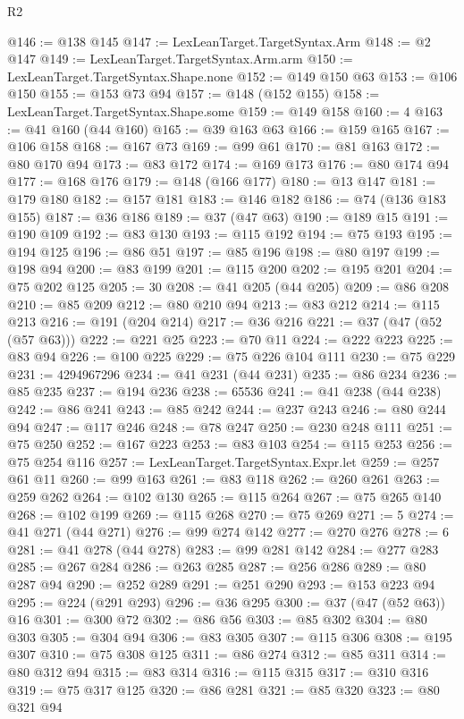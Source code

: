 \begin{lexlean}{R2}
\begin{coremodule}
@146 := @138 @145
@147 := LexLeanTarget.TargetSyntax.Arm
@148 := @2 @147
@149 := LexLeanTarget.TargetSyntax.Arm.arm
@150 := LexLeanTarget.TargetSyntax.Shape.none
@152 := @149 @150 @63
@153 := @106 @150
@155 := @153 @73 @94
@157 := @148 (@152 @155)
@158 := LexLeanTarget.TargetSyntax.Shape.some
@159 := @149 @158
@160 := 4
@163 := @41 @160 (@44 @160)
@165 := @39 @163 @63
@166 := @159 @165
@167 := @106 @158
@168 := @167 @73
@169 := @99 @61
@170 := @81 @163
@172 := @80 @170 @94
@173 := @83 @172
@174 := @169 @173
@176 := @80 @174 @94
@177 := @168 @176
@179 := @148 (@166 @177)
@180 := @13 @147
@181 := @179 @180
@182 := @157 @181
@183 := @146 @182
@186 := @74 (@136 @183 @155)
@187 := @36 @186
@189 := @37 (@47 @63)
@190 := @189 @15
@191 := @190 @109
@192 := @83 @130
@193 := @115 @192
@194 := @75 @193
@195 := @194 @125
@196 := @86 @51
@197 := @85 @196
@198 := @80 @197
@199 := @198 @94
@200 := @83 @199
@201 := @115 @200
@202 := @195 @201
@204 := @75 @202 @125
@205 := 30
@208 := @41 @205 (@44 @205)
@209 := @86 @208
@210 := @85 @209
@212 := @80 @210 @94
@213 := @83 @212
@214 := @115 @213
@216 := @191 (@204 @214)
@217 := @36 @216
@221 := @37 (@47 (@52 (@57 @63)))
@222 := @221 @25
@223 := @70 @11
@224 := @222 @223
@225 := @83 @94
@226 := @100 @225
@229 := @75 @226 @104 @111
@230 := @75 @229
@231 := 4294967296
@234 := @41 @231 (@44 @231)
@235 := @86 @234
@236 := @85 @235
@237 := @194 @236
@238 := 65536
@241 := @41 @238 (@44 @238)
@242 := @86 @241
@243 := @85 @242
@244 := @237 @243
@246 := @80 @244 @94
@247 := @117 @246
@248 := @78 @247
@250 := @230 @248 @111
@251 := @75 @250
@252 := @167 @223
@253 := @83 @103
@254 := @115 @253
@256 := @75 @254 @116
@257 := LexLeanTarget.TargetSyntax.Expr.let
@259 := @257 @61 @11
@260 := @99 @163
@261 := @83 @118
@262 := @260 @261
@263 := @259 @262
@264 := @102 @130
@265 := @115 @264
@267 := @75 @265 @140
@268 := @102 @199
@269 := @115 @268
@270 := @75 @269
@271 := 5
@274 := @41 @271 (@44 @271)
@276 := @99 @274 @142
@277 := @270 @276
@278 := 6
@281 := @41 @278 (@44 @278)
@283 := @99 @281 @142
@284 := @277 @283
@285 := @267 @284
@286 := @263 @285
@287 := @256 @286
@289 := @80 @287 @94
@290 := @252 @289
@291 := @251 @290
@293 := @153 @223 @94
@295 := @224 (@291 @293)
@296 := @36 @295
@300 := @37 (@47 (@52 @63)) @16
@301 := @300 @72
@302 := @86 @56
@303 := @85 @302
@304 := @80 @303
@305 := @304 @94
@306 := @83 @305
@307 := @115 @306
@308 := @195 @307
@310 := @75 @308 @125
@311 := @86 @274
@312 := @85 @311
@314 := @80 @312 @94
@315 := @83 @314
@316 := @115 @315
@317 := @310 @316
@319 := @75 @317 @125
@320 := @86 @281
@321 := @85 @320
@323 := @80 @321 @94

\end{coremodule}
\end{lexlean}
